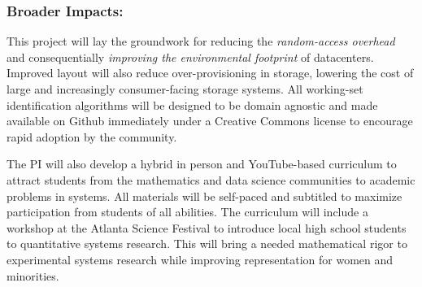 

\subsubsection*{Broader Impacts: }
This project will lay the groundwork for reducing the \emph{random-access
overhead} and consequentially \emph{improving the environmental footprint} of
datacenters.  %
Improved layout will also reduce over-provisioning in storage, lowering the cost
of large and increasingly consumer-facing storage systems.
All working-set identification algorithms will be designed to be domain
agnostic and made available on Github
immediately under a Creative Commons license to encourage rapid adoption by the
community.  %

The PI will also develop a hybrid in person and YouTube-based curriculum to
attract students from the mathematics and data science communities to academic
problems in systems.  All materials will be self-paced and subtitled to maximize
participation from students of all abilities.  The curriculum will include a
workshop at the Atlanta Science Festival to introduce local high school students
to quantitative systems research.  This will bring a needed mathematical rigor
to experimental systems research while improving representation for women and
minorities.  



